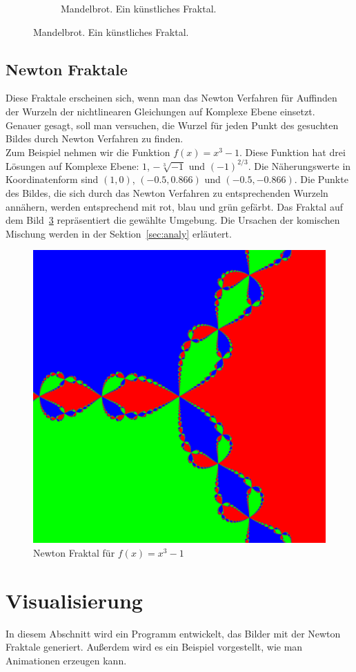 \documentclass[a4paper,12pt]{llncs}
\numberwithin{equation}{section}
\begin{document}
\begin{figure}[ht]
\begin{subfigure}{.5\textwidth}
	\caption{Mandelbrot. Ein künstliches Fraktal.~\cite{fractal_mandelbrot}}
	\label{fig:frac_math}
\end{subfigure}%
\end{figure}

\subsection{Newton Fraktale}
Diese Fraktale erscheinen sich, wenn man das Newton Verfahren für Auffinden der Wurzeln der nichtlinearen Gleichungen auf Komplexe Ebene einsetzt.
Genauer gesagt, soll man versuchen, die Wurzel für jeden Punkt des gesuchten Bildes durch Newton Verfahren zu finden.\\
Zum Beispiel nehmen wir die Funktion $f(x) = x^3 -1$. 
Diese Funktion hat drei Lösungen auf Komplexe Ebene: $1$, $-\sqrt[3]{-1}$ und $(-1)^{2/3}$. 
Die Näherungswerte in Koordinatenform sind $(1, 0)$, $(-0.5, 0.866)$ und $(-0.5, -0.866)$. 
Die Punkte des Bildes, die sich durch das Newton Verfahren zu entsprechenden Wurzeln annähern, werden entsprechend mit rot, blau und grün gefärbt.
Das Fraktal auf dem Bild~\ref{fig:output3_0} repräsentiert die gewählte Umgebung.
Die Ursachen der komischen Mischung werden in der Sektion~\ref{sec:analy} erläutert.
\begin{figure}[ht]   
	\centering
	\includegraphics[width=.5\linewidth]{figures/output3_0}
	\caption{Newton Fraktal für $f(x)=x^3-1$ }
	\label{fig:output3_0}
\end{figure}

\section{Visualisierung}\label{sec:vis}
In diesem Abschnitt wird ein Programm entwickelt, das Bilder mit der Newton Fraktale generiert.
Außerdem wird es ein Beispiel vorgestellt, wie man Animationen erzeugen kann.
\end{document}
